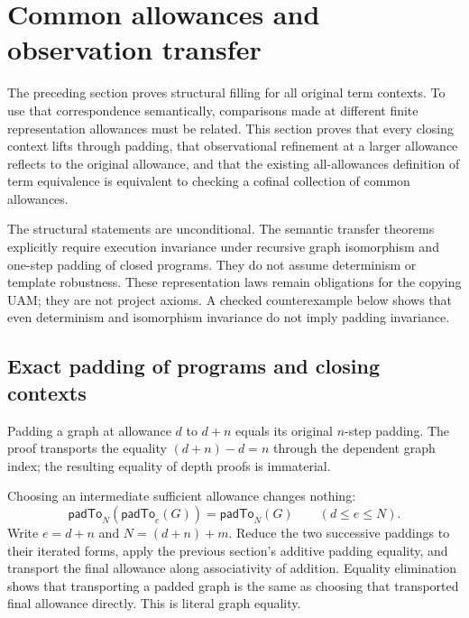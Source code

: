 \clearpage
\section{Common allowances and observation transfer}
\label{sec:copying-observation-padding}
The preceding section proves structural filling for all original term contexts.
To use that correspondence semantically, comparisons made at different finite
representation allowances must be related. This section proves that every
closing context lifts through padding, that observational refinement at a
larger allowance reflects to the original allowance, and that the existing
all-allowances definition of term equivalence is equivalent to checking a
cofinal collection of common allowances.

The structural statements are unconditional. The semantic transfer theorems
explicitly require execution invariance under recursive graph isomorphism and
one-step padding of closed programs. They do not assume determinism or template
robustness. These representation laws remain obligations for the copying UAM;
they are not project axioms. A checked counterexample below shows that even
determinism and isomorphism invariance do not imply padding invariance.

\subsection{Exact padding of programs and closing contexts}

Padding a graph at allowance $d$ to $d+n$ equals its original $n$-step
padding. The proof transports the equality $(d+n)-d=n$ through the dependent
graph index; the resulting equality of depth proofs is immaterial.

Choosing an intermediate sufficient allowance changes nothing:
\[
 \mathsf{padTo}_{N}(\mathsf{padTo}_{e}(G))
   =\mathsf{padTo}_{N}(G)\qquad(d\leq e\leq N).
\]
Write $e=d+n$ and $N=(d+n)+m$. Reduce the two successive paddings to their
iterated forms, apply the previous section's additive padding equality, and
transport the final allowance along associativity of addition. Equality
elimination shows that transporting a padded graph is the same as choosing
that transported final allowance directly. This is literal graph equality.




